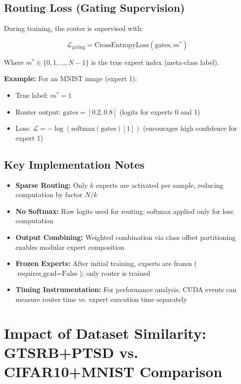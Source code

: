 \documentclass[11pt,a4paper]{article}
\begin{document}
\subsection{Routing Loss (Gating Supervision)}

During training, the router is supervised with:

\begin{equation}
    \mathcal{L}_{\text{gating}} = \text{CrossEntropyLoss}(\text{gates}, m^*)
\end{equation}

Where $m^* \in \{0, 1, \ldots, N-1\}$ is the true expert index (meta-class label).

\textbf{Example:} For an MNIST image (expert 1):
\begin{itemize}
    \item True label: $m^* = 1$
    \item Router output: $\text{gates} = [0.2, 0.8]$ (logits for experts 0 and 1)
    \item Loss: $\mathcal{L} = -\log(\text{softmax}(\text{gates})[1])$ (encourages high confidence for expert 1)
\end{itemize}

\subsection{Key Implementation Notes}

\begin{itemize}
    \item \textbf{Sparse Routing:} Only $k$ experts are activated per sample, reducing computation by factor $N/k$
    \item \textbf{No Softmax:} Raw logits used for routing; softmax applied only for loss computation
    \item \textbf{Output Combining:} Weighted combination via class offset partitioning enables modular expert composition
    \item \textbf{Frozen Experts:} After initial training, experts are frozen ($\text{requires\_grad} = \text{False}$); only router is trained
    \item \textbf{Timing Instrumentation:} For performance analysis, CUDA events can measure router time vs. expert execution time separately
\end{itemize}

\section{Impact of Dataset Similarity: GTSRB+PTSD vs. CIFAR10+MNIST Comparison}
\end{document}
